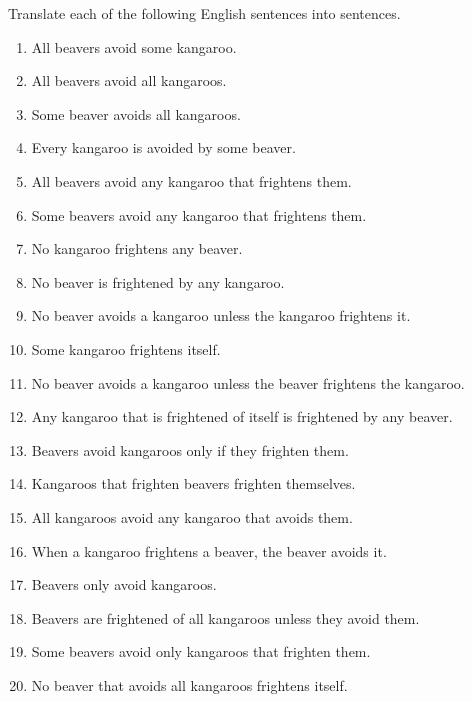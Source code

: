 Translate each of the following English sentences into \GQL{} sentences.
\begin{multicols}{2}
	\begin{enumerate}
		\item {All beavers avoid some kangaroo.}
		\item {All beavers avoid all kangaroos.}
		\item {Some beaver avoids all kangaroos.}
		\item {Every kangaroo is avoided by some beaver.}
		\item {All beavers avoid any kangaroo that frightens them.}
		\item {Some beavers avoid any kangaroo that frightens them.}
		\item {No kangaroo frightens any beaver.}
		\item {No beaver is frightened by any kangaroo.}
		\item {No beaver avoids a kangaroo unless the kangaroo frightens it.}
		\item {Some kangaroo frightens itself.}
		\item {No beaver avoids a kangaroo unless the beaver frightens the kangaroo.}
		\item {Any kangaroo that is frightened of itself is frightened by any beaver.}
		\item {Beavers avoid kangaroos only if they frighten them.}
		\item {Kangaroos that frighten beavers frighten themselves.}
		\item {All kangaroos avoid any kangaroo that avoids them.}
		\item {When a kangaroo frightens a beaver, the beaver avoids it.}
		\item {Beavers only avoid kangaroos.}
		\item {Beavers are frightened of all kangaroos unless they avoid them.}
		\item {Some beavers avoid only kangaroos that frighten them.}
		\item {No beaver that avoids all kangaroos frightens itself.}
	\end{enumerate}
\end{multicols}



